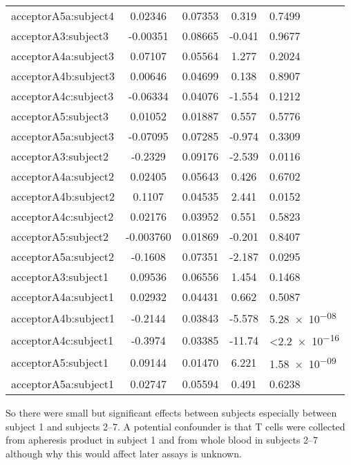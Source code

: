 \documentclass[../../sherrill-Mix_thesis.tex]{subfiles}
\begin{document}
{\begin{tabular}{|l|S[table-format=1.6]|S[table-format=1.5]|S[table-format=2.3]|l|}
acceptorA5a:subject4 & 0.02346    & 0.07353      & 0.319       & \num{0.7499}                  \\ 
acceptorA3:subject3  & -0.00351   & 0.08665      & -0.041      & \num{0.9677}                  \\ 
acceptorA4a:subject3 & 0.07107    & 0.05564      & 1.277       & \num{0.2024}                  \\ 
acceptorA4b:subject3 & 0.00646    & 0.04699      & 0.138       & \num{0.8907}                  \\ 
acceptorA4c:subject3 & -0.06334   & 0.04076      & -1.554      & \num{0.1212}                  \\ 
acceptorA5:subject3  & 0.01052    & 0.01887      & 0.557       & \num{0.5776}                  \\ 
acceptorA5a:subject3 & -0.07095   & 0.07285      & -0.974      & \num{0.3309}                  \\ 
acceptorA3:subject2  & -0.2329    & 0.09176      & -2.539      & \num{0.0116}                  \\ 
acceptorA4a:subject2 & 0.02405    & 0.05643      & 0.426       & \num{0.6702}                  \\ 
acceptorA4b:subject2 & 0.1107     & 0.04535      & 2.441       & \num{0.0152}                  \\ 
acceptorA4c:subject2 & 0.02176    & 0.03952      & 0.551       & \num{0.5823}                  \\ 
acceptorA5:subject2  & -0.003760  & 0.01869      & -0.201      & \num{0.8407}                  \\ 
acceptorA5a:subject2 & -0.1608    & 0.07351      & -2.187      & \num{0.0295}                  \\ 
acceptorA3:subject1  & 0.09536    & 0.06556      & 1.454       & \num{0.1468}                  \\ 
acceptorA4a:subject1 & 0.02932    & 0.04431      & 0.662       & \num{0.5087}                  \\ 
acceptorA4b:subject1 & -0.2144    & 0.03843      & -5.578      & \num{5.28e-08}                \\ 
acceptorA4c:subject1 & -0.3974    & 0.03385      & -11.74      & \textless\num{2.2e-16}        \\ 
acceptorA5:subject1  & 0.09144    & 0.01470      & 6.221       & \num{1.58e-09}                \\ 
acceptorA5a:subject1 & 0.02747    & 0.05594      & 0.491       & \num{0.6238}                  \\ 
\hline
\end{tabular}
}

So there were small but significant effects between subjects especially between subject 1 and subjects 2--7. A potential confounder is that T cells were collected from apheresis product in subject 1 and from whole blood in subjects 2--7 although why this would affect later assays is unknown. 
\end{document}
